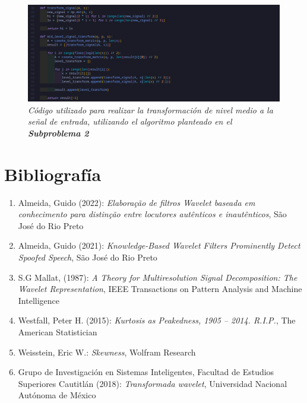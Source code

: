 \documentclass[11pt]{article}
\begin{document}
\begin{figure}
    \includegraphics[width=\textwidth]{transform}
    \caption{\it  Código utilizado para realizar la transformación de nivel medio a la señal de entrada, utilizando el algoritmo planteado en el {\bf Subproblema 2}}
\end{figure}


\clearpage

\section*{Bibliografía}
\begin{enumerate}
    \item Almeida, Guido (2022): {\it Elaboração de filtros Wavelet baseada em
    conhecimento para distinção entre locutores
    autênticos e inautênticos}, São José do Rio Preto
    \item Almeida, Guido (2021): {\it Knowledge-Based Wavelet Filters Prominently
    Detect Spoofed Speech}, São José do Rio Preto
    \item S.G Mallat, (1987): {\it A Theory for Multiresolution Signal Decomposition: The Wavelet Representation}, IEEE Transactions on Pattern Analysis and Machine Intelligence
    \item Westfall, Peter H. (2015): {\it Kurtosis as Peakedness, 1905 – 2014. R.I.P.}, The American Statistician
    \item Weisstein, Eric W.: {\it Skewness}, Wolfram Research
    \item Grupo de Investigación en Sistemas Inteligentes, Facultad de Estudios Superiores Cautitlán (2018): {\it Transformada wavelet}, Universidad Nacional Autónoma de México
\end{enumerate}
\end{document}
